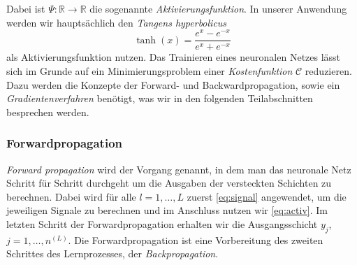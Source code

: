 Dabei ist $\Psi: \mathbb{R} \rightarrow \mathbb{R}$ die sogenannte \textit{Aktivierungsfunktion}. In unserer Anwendung
werden wir hauptsächlich den \textit{Tangens hyperbolicus}
\[
    \tanh(x)=\frac{e^x - e^{-x}}{e^x + e^{-x}}
\]
als Aktivierungsfunktion nutzen. Das Trainieren eines neuronalen Netzes lässt sich im Grunde auf ein Minimierungsproblem
einer \textit{Kostenfunktion} $\mathcal{C}$
reduzieren. Dazu werden die Konzepte der Forward- und Backwardpropagation, sowie ein \textit{Gradientenverfahren}
benötigt, was wir in den folgenden Teilabschnitten besprechen werden.

\subsubsection{Forwardpropagation}
{\em Forward propagation} wird der Vorgang genannt, in dem man das neuronale Netz Schritt für Schritt durchgeht um die
Ausgaben der versteckten Schichten zu berechnen. Dabei wird für alle $l = 1, \dots, L$ zuerst \eqref{eq:signal}
angewendet, um die jeweiligen Signale zu berechnen und im Anschluss nutzen wir \eqref{eq:activ}. Im letzten
Schritt der Forwardpropagation erhalten wir die Ausgangsschicht $y_{j}$, $j = 1 ,\dots, n^{(L)}$. Die Forwardpropagation ist
eine Vorbereitung des zweiten Schrittes des Lernprozesses, der \textit{Backpropagation}.

